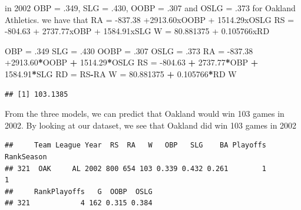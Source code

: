 \documentclass[
]{article}
\newenvironment{Shaded}{\begin{snugshade}}{\end{snugshade}}
\newcommand{\DecValTok}[1]{\textcolor[rgb]{0.00,0.00,0.81}{#1}}
\newcommand{\FloatTok}[1]{\textcolor[rgb]{0.00,0.00,0.81}{#1}}
\newcommand{\NormalTok}[1]{#1}
\newcommand{\OperatorTok}[1]{\textcolor[rgb]{0.81,0.36,0.00}{\textbf{#1}}}
\newcommand{\StringTok}[1]{\textcolor[rgb]{0.31,0.60,0.02}{#1}}
\begin{document}
in 2002 OBP = .349, SLG = .430, OOBP = .307 and OSLG = .373 for Oakland
Athletics. we have that RA = -837.38 +2913.60xOOBP + 1514.29xOSLG RS =
-804.63 + 2737.77xOBP + 1584.91xSLG W = 80.881375 + 0.105766xRD

\begin{Shaded}
\begin{Highlighting}[]
\NormalTok{OBP =}\StringTok{ }\FloatTok{.349}
\NormalTok{SLG =}\StringTok{ }\FloatTok{.430}
\NormalTok{OOBP =}\StringTok{ }\FloatTok{.307}
\NormalTok{OSLG =}\StringTok{ }\FloatTok{.373}
\NormalTok{RA =}\StringTok{ }\FloatTok{-837.38} \FloatTok{+2913.60}\OperatorTok{*}\NormalTok{OOBP }\OperatorTok{+}\StringTok{ }\FloatTok{1514.29}\OperatorTok{*}\NormalTok{OSLG}
\NormalTok{RS =}\StringTok{ }\FloatTok{-804.63} \OperatorTok{+}\StringTok{ }\FloatTok{2737.77}\OperatorTok{*}\NormalTok{OBP }\OperatorTok{+}\StringTok{ }\FloatTok{1584.91}\OperatorTok{*}\NormalTok{SLG}
\NormalTok{RD =}\StringTok{ }\NormalTok{RS}\OperatorTok{-}\NormalTok{RA}
\NormalTok{W =}\StringTok{ }\FloatTok{80.881375} \OperatorTok{+}\StringTok{ }\FloatTok{0.105766}\OperatorTok{*}\NormalTok{RD}
\NormalTok{W}
\end{Highlighting}
\end{Shaded}

\begin{verbatim}
## [1] 103.1385
\end{verbatim}

From the three models, we can predict that Oakland would win 103 games
in 2002. By looking at our dataset, we see that Oakland did win 103
games in 2002

\begin{Shaded}
\end{Shaded}

\begin{verbatim}
##     Team League Year  RS  RA   W   OBP   SLG    BA Playoffs RankSeason
## 321  OAK     AL 2002 800 654 103 0.339 0.432 0.261        1          1
##     RankPlayoffs   G  OOBP  OSLG
## 321            4 162 0.315 0.384
\end{verbatim}
\end{document}

